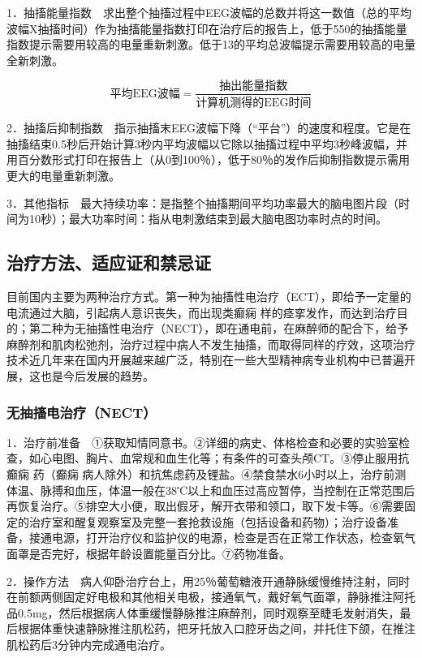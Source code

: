 1．抽搐能量指数　求出整个抽搐过程中EEG波幅的总数并将这一数值（总的平均波幅X抽搐时间）作为抽搐能量指数打印在治疗后的报告上，低于550的抽搐能量指数提示需要用较高的电量重新刺激。低于13的平均总波幅提示需要用较高的电量全新刺激。

\[
    \text{平均EEG波幅}=\frac{\text{抽出能量指数}}{\text{计算机测得的EEG时间}}
\]

2．抽搐后抑制指数　指示抽搐末EEG波幅下降（“平台”）的速度和程度。它是在抽搐结束0.5秒后开始计算3秒内平均波幅以它除以抽搐过程中平均3秒峰波幅，并用百分数形式打印在报告上（从0到100％），低于80％的发作后抑制指数提示需用更大的电量重新刺激。

3．其他指标　最大持续功率：是指整个抽搐期间平均功率最大的脑电图片段（时间为10秒）；最大功率时间：指从电刺激结束到最大脑电图功率时点的时间。

\subsection{治疗方法、适应证和禁忌证}

目前国内主要为两种治疗方式。第一种为抽搐性电治疗（ECT），即给予一定量的电流通过大脑，引起病人意识丧失，而出现类癫痫
样的痉挛发作，而达到治疗目的；第二种为无抽搐性电治疗（NECT），即在通电前，在麻醉师的配合下，给予麻醉剂和肌肉松弛剂，治疗过程中病人不发生抽搐，而取得同样的疗效，这项治疗技术近几年来在国内开展越来越广泛，特别在一些大型精神病专业机构中已普遍开展，这也是今后发展的趋势。

\subsubsection{无抽搐电治疗（NECT）}

1．治疗前准备　①获取知情同意书。②详细的病史、体格检查和必要的实验室检查，如心电图、胸片、血常规和血生化等；有条件的可查头颅CT。③停止服用抗癫痫
药（癫痫
病人除外）和抗焦虑药及锂盐。④禁食禁水6小时以上，治疗前测体温、脉搏和血压，体温一般在38℃以上和血压过高应暂停，当控制在正常范围后再恢复治疗。⑤排空大小便，取出假牙，解开衣带和领口，取下发卡等。⑥需要固定的治疗室和醒复观察室及完整一套抢救设施（包括设备和药物）；治疗设备准备，接通电源，打开治疗仪和监护仪的电源，检查是否在正常工作状态，检查氧气面罩是否完好，根据年龄设置能量百分比。⑦药物准备。

2．操作方法　病人仰卧治疗台上，用25％葡萄糖液开通静脉缓慢维持注射，同时在前额两侧固定好电极和其他相关电极，接通氧气，戴好氧气面罩，静脉推注阿托品0.5mg，然后根据病人体重缓慢静脉推注麻醉剂，同时观察至睫毛发射消失，最后根据体重快速静脉推注肌松药，把牙托放入口腔牙齿之间，并托住下颌，在推注肌松药后3分钟内完成通电治疗。

